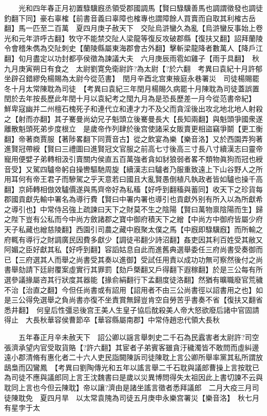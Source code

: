 　　光和四年春正月初置騄驥廐丞領受郡國調馬【賢曰騄驥善馬也調謂徵發也調徒釣翻下同】豪右辜榷【前書音義曰辜障也榷專也謂障餘人買賣而自取其利榷古岳翻】馬一匹至二百萬　夏四月庚子赦天下　交阯烏滸蠻久為亂【烏滸蠻反事始上卷光和元年滸呼古翻】牧守不能禁交阯人梁龍等復反攻破郡縣【復扶又翻】詔拜蘭陵令會稽朱儁為交阯刺史【蘭陵縣屬東海郡會古外翻】擊斬梁龍降者數萬人【降戶江翻】旬月盡定以功封都亭侯徵為諫議大夫　六月庚辰雨雹如雞子【雨于具翻】　秋九月庚寅朔日有食之　太尉劉寛免衛尉許?為太尉【?於六翻　考異曰袁紀十月許郁坐辟召錯繆免楊賜為太尉今從范書】　閏月辛酉北宫東掖庭永巷署災　司徒楊賜罷　冬十月太常陳耽為司徒　【考異曰袁紀三年閏月楊賜久病罷十月陳耽為司徒蓋誤置閏於去年按長歷此年閏十月以袁紀考之閠九月為是恐長歷差一月今從范書帝紀】　鮮卑寇幽并二州檀石槐死子和連代立和連才力不及父而貪淫後出攻北地北地人射殺之【射而亦翻】其子騫曼尚幼兄子魁頭立後騫曼長大【長知兩翻】與魁頭爭國衆遂離散魁頭死弟步度根立　是歲帝作列肆於後宫使諸采女販賣更相盜竊爭鬬【更工衡翻】帝著商賈服【著陟畧翻下同賈音古】從之飲宴為樂【樂音洛】又於西園弄狗著進賢冠帶綬【賢曰三禮圖曰進賢冠文官服之前高七寸後高三寸長八寸續漢志曰靈帝寵用便嬖子弟轉相汲引賣關内侯直五百萬強者貪如豺狼弱者畧不類物眞狗而冠也綬音受】又駕四驢帝躬自操轡驅馳周旋【續漢志曰驢者乃服重致遠上下山谷野人之所用耳何有帝王君子而驂駕之乎天意若曰國且大亂賢愚倒植凡執政者皆如驢也操千高翻】京師轉相倣效驢價遂與馬齊帝好為私稸【好呼到翻稸與蓄同】收天下之珍貨每郡國貢獻先輸中署名為導行費【賢曰中署内署也導引也貢獻外别有所入以為所獻希之導引也】中常侍呂強上疏諫曰天下之財莫不生之陰陽【賢曰萬物禀陰陽而生】歸之陛下豈有公私而今中尚方斂諸郡之寶中御府積天下之繒【中尚方中御府皆屬少府天子私藏也繒慈陵翻】西園引司農之藏中廐聚太僕之馬【中廐即騄驥廐】而所輸之府輒有導行之財調廣民因費多獻少【調徒弔翻少詩沼翻】姦吏因其利百姓受其敝又阿媚之臣好獻其私【好呼到翻】容謟姑息自此而進舊典選舉委任三府尚書受奏御而已【三府選其人而舉之尚書受其奏以進御】受試任用責以成功功無可察然後付之尚書舉劾請下廷尉覆案虛實行其罪罰【劾戶槩翻又戶得翻下遐稼翻】於是三公每有所選參議掾屬咨其行狀度其器能【掾俞絹翻行下孟翻度徒洛翻】然猶有曠職廢官荒穢不治【治直之翻】今但任尚書或有詔用【詔用者不由三公尚書徑以詔書用之也】如是三公得免選舉之負尚書亦復不坐責賞無歸豈肯空自勞苦乎書奏不省【復扶又翻省悉井翻】　何皇后性彊忌後宫王美人生皇子協后酖殺美人帝大怒欲廢后諸中官固請得止　大長秋華容侯曹節卒【華容縣屬南郡】中常侍趙忠代領大長秋

　　五年春正月辛未赦天下　詔公卿以謡言舉刺史二千石為民蠧害者太尉許?司空張濟承望内官受取貨賂【?許六翻】其宦者子弟賓客雖貪汙穢濁皆不敢問而虛糾邊遠小郡清脩有惠化者二十六人吏民詣闕陳訴司徒陳耽上言公卿所舉率黨其私所謂放鴟梟而囚鸞鳳　【考異曰劉陶傳光和五年以謠言舉二千石耽與議郎曹操上言按耽已為司徒不應與議郎同上言王沈魏書曰是歲以災異博問得失太祖因此上書切諫不云與耽同上言也今但云陳耽】帝以讓?濟由是諸坐謠言徵者悉拜議郎　二月大疫三月司徒陳耽免　夏四月旱　以太常袁隗為司徒五月庚申永樂宫署災【樂音洛】　秋七月有星孛于太

